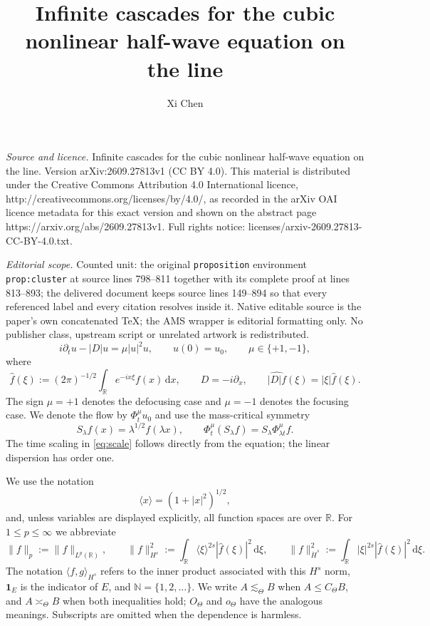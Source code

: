 \documentclass[10pt,a4paper]{amsart}
\numberwithin{equation}{section}
\newcommand{\flow}[1]{\Phi^{#1}}
\begin{document}
\title[Infinite cascades for the cubic nonlinear half-wave equation]{Infinite cascades for the cubic nonlinear half-wave equation on the line}
\author{Xi Chen}
\date{}
\maketitle
\noindent\emph{Source and licence.} Infinite cascades for the cubic nonlinear half-wave equation on the line. Version arXiv:2609.27813v1 (CC BY 4.0). This material is distributed under the Creative Commons Attribution 4.0 International licence, http://creativecommons.org/licenses/by/4.0/, as recorded in the arXiv OAI licence metadata for this exact version and shown on the abstract page https://arxiv.org/abs/2609.27813v1. Full rights notice: licenses/arxiv-2609.27813-CC-BY-4.0.txt.\par\smallskip
\noindent\textit{Editorial scope.} Counted unit: the original \texttt{proposition} environment \texttt{prop:cluster} at source lines 798--811 together with its complete proof at lines 813--893; the delivered document keeps source lines 149--894 so that every referenced label and every citation resolves inside it. Native editable source is the paper's own concatenated TeX; the AMS wrapper is editorial formatting only. No publisher class, upstream script or unrelated artwork is redistributed.
\begin{equation}\label{eq:hw}
 i\partial_tu-|D|u=\mu|u|^2u,
 \qquad u(0)=u_0,
 \qquad \mu\in\{+1,-1\},
\end{equation}
where
\[
 \widehat f(\xi):=(2\pi)^{-1/2}\int_{\mathbb R}e^{-ix\xi}f(x)\,\mathrm dx,
 \qquad D=-i\partial_x,
 \qquad \widehat{|D|f}(\xi)=|\xi|\widehat f(\xi).
\]
The sign $\mu=+1$ denotes the defocusing case and $\mu=-1$ denotes the focusing case.  We denote the flow by
$\flow\mu_tu_0$ and use the mass-critical symmetry
\begin{equation}\label{eq:scale}
 S_\lambda f(x)=\lambda^{1/2}f(\lambda x),
 \qquad
 \flow\mu_t(S_\lambda f)=S_\lambda\flow\mu_{\lambda t}f.
\end{equation}
The time scaling in \eqref{eq:scale} follows directly from the equation; the
linear dispersion has order one.

We use the notation
\[
 \langle x\rangle=(1+|x|^2)^{1/2},
\]
and, unless variables are displayed explicitly, all function spaces are over
$\mathbb R$.  For $1\leq p\leq\infty$ we abbreviate
\begin{equation}\label{eq:norm-conventions}
 \|f\|_p:=\|f\|_{L^p(\mathbb R)},\qquad
 \|f\|_{H^s}^2:=\int_{\mathbb R}\langle\xi\rangle^{2s}|\widehat f(\xi)|^2
 \,\mathrm d\xi,\qquad
 \|f\|_{\dot H^s}^2:=\int_{\mathbb R}|\xi|^{2s}|\widehat f(\xi)|^2
 \,\mathrm d\xi.
\end{equation}
The notation $\langle f,g\rangle_{H^s}$ refers to the inner product associated
with this $H^s$ norm, $\mathbf 1_E$ is the indicator of $E$, and
$\mathbb N=\{1,2,\ldots\}$.  We write $A\lesssim_\Theta B$ when
$A\leq C_\Theta B$, and $A\asymp_\Theta B$ when both inequalities hold;
$O_\Theta$ and $o_\Theta$ have the analogous meanings.  Subscripts are omitted
when the dependence is harmless.
\end{document}
